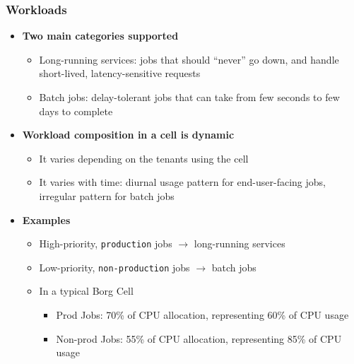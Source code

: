 \begin{frame}
\frametitle{Workloads}
\begin{itemize}
	\item {\bf Two main categories supported}
	\begin{itemize}
		\item Long-running services: jobs that should ``never'' go down, and handle short-lived, latency-sensitive requests
		\item Batch jobs: delay-tolerant jobs that can take from few seconds to few days to complete
	\end{itemize}
	\item {\bf Workload composition in a cell is dynamic}
	\begin{itemize}
		\item It varies depending on the tenants using the cell
		\item It varies with time: diurnal usage pattern for end-user-facing jobs, irregular pattern for batch jobs
	\end{itemize}
	\item {\bf Examples}
	\begin{itemize}
		\item High-priority, \texttt{production} jobs $\to$ long-running services
		\item Low-priority, \texttt{non-production} jobs $\to$ batch jobs
		\item In a typical Borg Cell
		\begin{itemize}
			\item Prod Jobs: 70\% of CPU allocation, representing 60\% of CPU usage
			\item Non-prod Jobs: 55\% of CPU allocation, representing 85\% of CPU usage
		\end{itemize}
	\end{itemize}
\end{itemize}
\end{frame}

